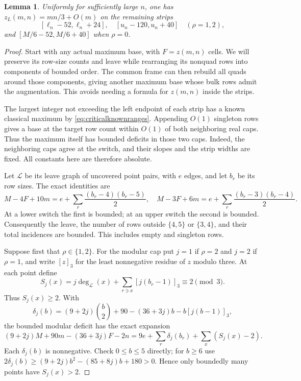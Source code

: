 \documentclass[11pt]{article}
\newtheorem{lemma}[theorem]{Lemma}
\newcommand{\zl}{z_L}
\begin{document}
\begin{lemma}\label{lem:criticalstrips}
Uniformly for sufficiently large $n$, one has $\zl(m,n)=mn/3+O(m)$
on the remaining strips
\[
 [\ell_n-52,\ell_n+24],\quad[u_n-120,u_n+40]
 \quad(\rho=1,2),
\]
and $[M/6-52,M/6+40]$ when $\rho=0$.
\end{lemma}
\begin{proof}
Start with any actual maximum base, with $F=z(m,n)$ cells.
We will preserve its row-size counts and leave while rearranging its
nonquad rows into components of bounded order. The common frame can then
rebuild all quads around those components, giving another maximum base
whose bulk rows admit the augmentation. This avoids needing a formula
for $z(m,n)$ inside the strips.

The largest integer not exceeding the left endpoint of each strip has
a known classical maximum by
\eqref{eq:criticalknownranges}. Appending $O(1)$ singleton rows gives
a base at the target row count within $O(1)$ of both neighboring real
caps. Thus the maximum itself has bounded deficits in those two caps.
Indeed, the neighboring caps agree at the switch, and their slopes and
the strip widths are fixed. All constants here are therefore absolute.

Let $\mathcal L$ be its leave graph of uncovered point pairs, with $e$
edges, and let $b_r$ be its row sizes. The exact identities are
\begin{equation}\label{eq:criticalconvexdeficits}
 M-4F+10m=e+\sum_r\frac{(b_r-4)(b_r-5)}2,
 \quad
 M-3F+6m=e+\sum_r\frac{(b_r-3)(b_r-4)}2.
\end{equation}
At a lower switch the first is bounded; at an upper switch the second
is bounded. Consequently the leave, the number of rows outside
$\{4,5\}$ or $\{3,4\}$, and their total incidences are bounded.
This includes empty and singleton rows.

Suppose first that $\rho\in\{1,2\}$. For the modular cap put $j=1$ if
$\rho=2$ and $j=2$ if $\rho=1$, and
write $[z]_3$ for the least nonnegative residue of $z$ modulo three.
At each point define
\[
 S_j(x)=j\deg_{\mathcal L}(x)
          +\sum_{r\ni x}[j(b_r-1)]_3\equiv2\pmod3.
\]
Thus $S_j(x)\ge2$. With
\[
 \delta_j(b)=(9+2j)\binom b2+90-(36+3j)b-b[j(b-1)]_3,
\]
the bounded modular deficit has the exact expansion
\[
 (9+2j)M+90m-(36+3j)F-2n
 =9e+\sum_r\delta_j(b_r)+\sum_x(S_j(x)-2).
\]
Each $\delta_j(b)$ is nonnegative. Check $0\le b\le5$ directly;
for $b\ge6$ use
$2\delta_j(b)\ge(9+2j)b^2-(85+8j)b+180>0$.
Hence only boundedly many points have $S_j(x)>2$.


\end{proof}
\end{document}

